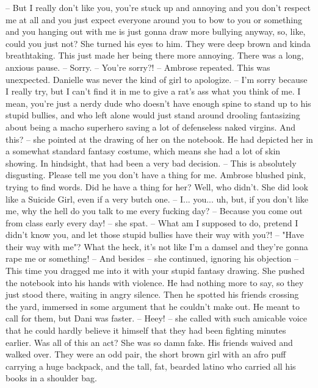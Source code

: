 -- But I really don't like you, you're stuck up and annoying and you don't respect me at all and you just expect everyone around you to bow to you or something 
and you hanging out with me is just gonna draw more bullying anyway, so, like, could you just not?
She turned his eyes to him. They were deep brown and kinda breathtaking. This just made her being there more annoying. There was a long, anxious pause.
-- Sorry.
-- You're sorry?! -- Ambrose repeated. This was unexpected. Danielle was never the kind of girl to apologize.
-- I'm sorry because I really try, but I can't find it in me to give a rat's ass what you think of me. I mean, you're just a nerdy dude who doesn't have enough spine to
stand up to his stupid bullies, and who left alone would just stand around drooling fantasizing about being a macho superhero saving a lot of defenseless naked virgins.
And this? -- she pointed at the drawing of her on the notebook. He had depicted her in a somewhat standard fantasy costume, which means she had a lot of skin showing. 
In hindsight, that had been a very bad decision. -- This is absolutely disgusting. Please tell me you don't have a thing for me.
Ambrose blushed pink, trying to find words. Did he have a thing for her? Well, who didn't. She did look like a Suicide Girl, even if a very butch one.
-- I... you... uh, but, if you don't like me, why the hell do you talk to me every fucking day?
-- Because you come out from class early every day! -- she spat. -- What am I supposed to do, pretend I didn't know you, and let those stupid bullies have their way with you?!
-- "Have their way with me"? What the heck, it's not like I'm a damsel and they're gonna rape me or something!
-- And besides -- she continued, ignoring his objection -- This time you dragged me into it with your stupid fantasy drawing.
She pushed the notebook into his hands with violence. He had nothing more to say, so they just stood there, waiting in angry silence.
Then he spotted his friends crossing the yard, immersed in some argument that he couldn't make out. He meant to call for them, but Dani was faster.
-- Heey! -- she called with such amicable voice that he could hardly believe it himself that they had been fighting minutes earlier. Was all of this an act? She was so damn fake.
His friends waived and walked over. They were an odd pair, the short brown girl with an afro puff carrying a huge backpack, and the tall, fat, bearded latino
who carried all his books in a shoulder bag.

